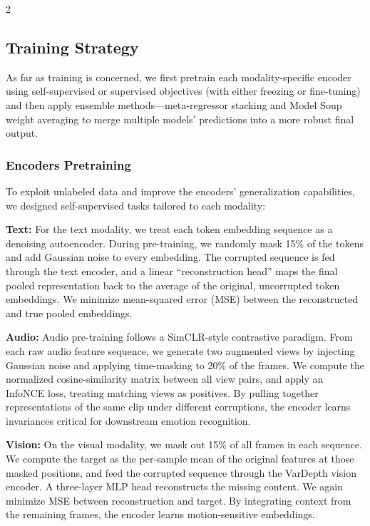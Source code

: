 \documentclass[10pt]{article}
\begin{document}
\begin{multicols}{2}
\subsection{Training Strategy}
\par As far as training is concerned, we first pretrain each modality-specific encoder using self-supervised or supervised objectives (with either freezing or fine-tuning) and then apply ensemble methods—meta-regressor stacking and Model Soup weight averaging \cite{modelsoup} to merge multiple models’ predictions into a more robust final output.

\subsubsection{Encoders Pretraining}
\par To exploit unlabeled data and improve the encoders' generalization capabilities, we designed self-supervised tasks tailored to each modality:
\par{\textbf{Text:}} For the text modality, we treat each token embedding sequence as a denoising autoencoder. During pre-training, we randomly mask 15\% of the tokens and add Gaussian noise to every embedding. The corrupted sequence is fed through the text encoder, and a linear “reconstruction head” maps the final pooled representation back to the average of the original, uncorrupted token embeddings. We minimize mean-squared error (MSE) between the reconstructed and true pooled embeddings. 
\par{\textbf{Audio:}} Audio pre-training follows a SimCLR-style contrastive paradigm. From each raw audio feature sequence, we generate two augmented views by injecting Gaussian noise and applying time-masking to 20\% of the frames. We compute the normalized cosine-similarity matrix between all view pairs, and apply an InfoNCE loss, treating matching views as positives. By pulling together representations of the same clip under different corruptions, the encoder learns invariances critical for downstream emotion recognition.
\par{\textbf{Vision:}} On the visual modality, we mask out 15\% of all frames in each sequence. We compute the target as the per-sample mean of the original features at those masked positions, and feed the corrupted sequence through the VarDepth vision encoder. A three-layer MLP head reconstructs the missing content. We again minimize MSE between reconstruction and target. By integrating context from the remaining frames, the encoder learns motion-sensitive embeddings.

\end{multicols}
\end{document}
